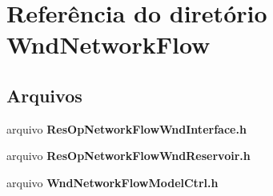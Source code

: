 \section{Referência do diretório Wnd\+Network\+Flow}
\label{dir_b9948aa38924a6844e4fa9ac7820689a}
\subsection*{Arquivos}
\begin{DoxyCompactItemize}
\item 
arquivo {\bf Res\+Op\+Network\+Flow\+Wnd\+Interface.\+h}
\item 
arquivo {\bf Res\+Op\+Network\+Flow\+Wnd\+Reservoir.\+h}
\item 
arquivo {\bf Wnd\+Network\+Flow\+Model\+Ctrl.\+h}
\end{DoxyCompactItemize}

